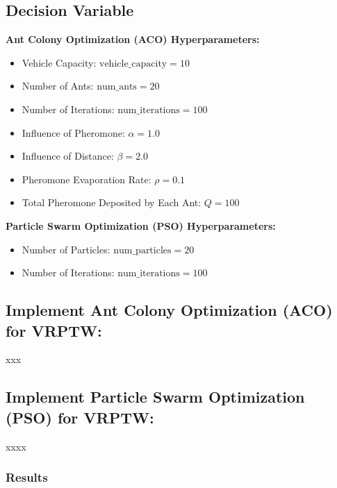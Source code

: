 \subsection{Decision Variable}
\textbf{Ant Colony Optimization (ACO) Hyperparameters:}
\begin{itemize}
    \item Vehicle Capacity: \( \text{vehicle\_capacity} = 10 \)
    \item Number of Ants: \( \text{num\_ants} = 20 \)
    \item Number of Iterations: \( \text{num\_iterations} = 100 \)
    \item Influence of Pheromone: \( \alpha = 1.0 \)
    \item Influence of Distance: \( \beta = 2.0 \)
    \item Pheromone Evaporation Rate: \( \rho = 0.1 \)
    \item Total Pheromone Deposited by Each Ant: \( Q = 100 \)
\end{itemize}
\textbf{Particle Swarm Optimization (PSO) Hyperparameters:}
\begin{itemize}
    \item Number of Particles: \( \text{num\_particles} = 20 \)
    \item Number of Iterations: \( \text{num\_iterations} = 100 \)
\end{itemize}
\subsection{Implement Ant Colony Optimization (ACO) for VRPTW:}
xxx
\subsection{Implement Particle Swarm Optimization (PSO) for VRPTW:}
xxxx
\subsubsection{Results}

